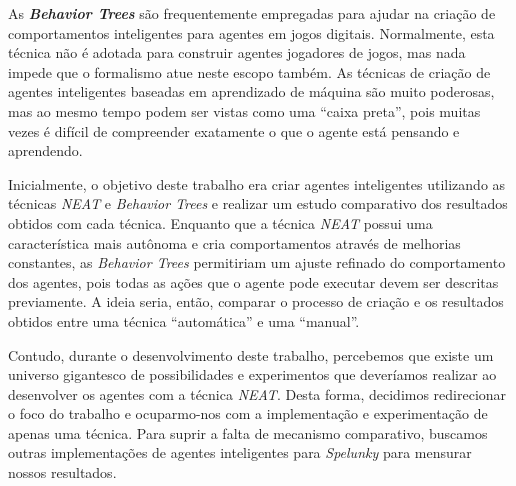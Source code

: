 As \textbf{\textit{Behavior Trees}} são frequentemente empregadas para ajudar na
criação de comportamentos inteligentes para agentes em jogos digitais.
Normalmente, esta técnica não é adotada para construir agentes jogadores de
jogos, mas nada impede que o formalismo atue neste escopo também. As técnicas de
criação de agentes inteligentes baseadas em aprendizado de máquina são muito
poderosas, mas ao mesmo tempo podem ser vistas como uma ``caixa preta'', pois
muitas vezes é difícil de compreender exatamente o que o agente está pensando e
aprendendo.

Inicialmente, o objetivo deste trabalho era criar agentes inteligentes
utilizando as técnicas \textit{NEAT} e \textit{Behavior Trees} e realizar um
estudo comparativo dos resultados obtidos com cada técnica. Enquanto que a
técnica \textit{NEAT} possui uma característica mais autônoma e cria
comportamentos através de melhorias constantes, as \textit{Behavior Trees}
permitiriam um ajuste refinado do comportamento dos agentes, pois todas as ações
que o agente pode executar devem ser descritas previamente. A ideia seria,
então, comparar o processo de criação e os resultados obtidos entre uma técnica
``automática'' e uma ``manual''.

Contudo, durante o desenvolvimento deste trabalho, percebemos que existe um
universo gigantesco de possibilidades e experimentos que deveríamos realizar ao
desenvolver os agentes com a técnica \textit{NEAT}. Desta forma, decidimos
redirecionar o foco do trabalho e ocuparmo-nos com a implementação e
experimentação de apenas uma técnica. Para suprir a falta de mecanismo
comparativo, buscamos outras implementações de agentes inteligentes para
\textit{Spelunky} para mensurar nossos resultados.
